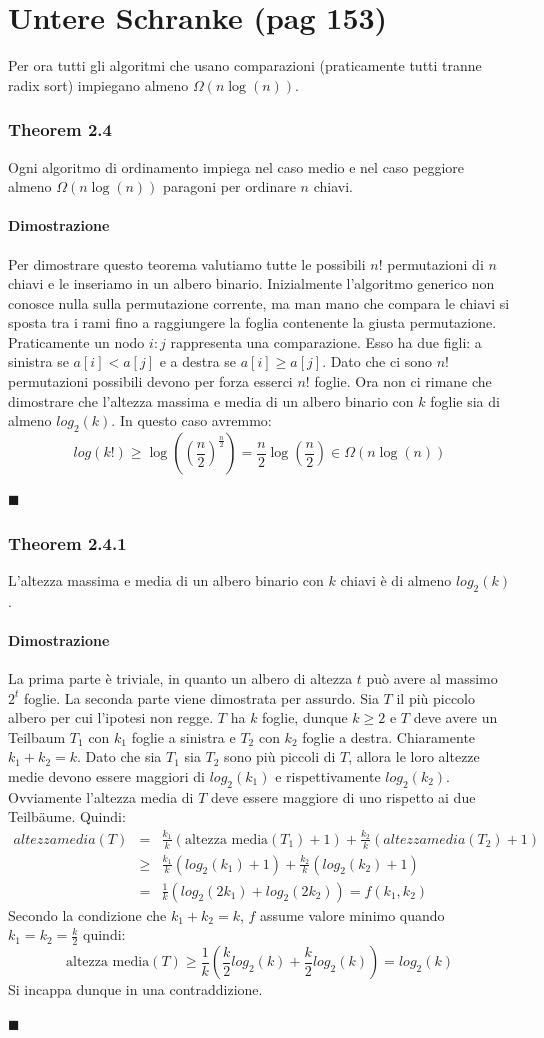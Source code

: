 \documentclass[a4paper]{book}
\newenvironment{mytheorem}[1]{\subsubsection*{Theorem #1}}{\begin{flushright}$\blacksquare$\end{flushright}}
\begin{document}
\section{Untere Schranke (pag 153)}
Per ora tutti gli algoritmi che usano comparazioni (praticamente tutti tranne radix sort) impiegano almeno $\Omega (n \log (n))$. 
\begin{mytheorem}{2.4}
Ogni algoritmo di ordinamento impiega nel caso medio e nel caso peggiore almeno $\Omega (n \log (n))$ paragoni per ordinare $n$ chiavi.
\paragraph*{Dimostrazione}
Per dimostrare questo teorema valutiamo tutte le possibili $n!$ permutazioni di $n$ chiavi e le inseriamo in un albero binario. Inizialmente l'algoritmo generico non conosce nulla sulla permutazione corrente, ma man mano che compara le chiavi si sposta tra i rami fino a raggiungere la foglia contenente la giusta permutazione. Praticamente un nodo $i:j$ rappresenta una comparazione. Esso ha due figli: a sinistra se $a[i]<a[j]$ e a destra se $a[i] \geq a[j]$. Dato che ci sono $n!$ permutazioni possibili devono per forza esserci $n!$ foglie. Ora non ci rimane che dimostrare che l'altezza massima e media di un albero binario con $k$ foglie sia di almeno $log_2 (k)$. In questo caso avremmo:
$$ log (k!) \geq \log \left(\left(\frac{n}{2}\right)^{\frac{n}{2}}\right) = \frac{n}{2} \log \left(\frac{n}{2}\right) \in \Omega (n \log (n))$$
\end{mytheorem}
\begin{mytheorem}{2.4.1}
L'altezza massima e media di un albero binario con $k$ chiavi è di almeno $ log_2 (k)$.
\paragraph*{Dimostrazione}
La prima parte è triviale, in quanto un albero di altezza $t$ può avere al massimo $2^t$ foglie. La seconda parte viene dimostrata per assurdo. Sia $T$ il più piccolo albero per cui l'ipotesi non regge. $T$ ha $k$ foglie, dunque $k \geq 2$ e $T$ deve avere un Teilbaum $T_1$ con $k_1$ foglie a sinistra e $T_2$ con $k_2$ foglie a destra. Chiaramente $k_1+k_2=k$. Dato che sia $T_1$ sia $T_2$ sono più piccoli di $T$, allora le loro altezze medie devono essere maggiori di $log_2(k_1)$ e rispettivamente $log_2 (k_2)$. Ovviamente l'altezza media di $T$ deve essere maggiore di uno rispetto ai due Teilbäume. Quindi:
\begin{eqnarray}
 altezza media(T) &=&  \frac{k_1}{k}(\mbox{altezza media}(T_1)+1)+\frac{k_2}{k}(altezza media(T_2)+1)      \nonumber \\
   &\geq & \frac{k_1}{k}(log_2(k_1)+1)+\frac{k_2}{k}(log_2(k_2)+1) \nonumber \\
   &=&\frac{1}{k}(log_2(2k_1)+log_2(2k_2)) = f(k_1,k_2)
\end{eqnarray}
Secondo la condizione che $k_1+k_2=k$, $f$ assume valore minimo quando $k_1=k_2=\frac{k}{2}$ quindi:
$$ \mbox{altezza media}(T) \geq \frac{1}{k}\left(\frac{k}{2} log_2(k)+\frac{k}{2} log_2(k)\right)=log_2 (k)$$
Si incappa dunque in una contraddizione.
\end{mytheorem}
\end{document}
